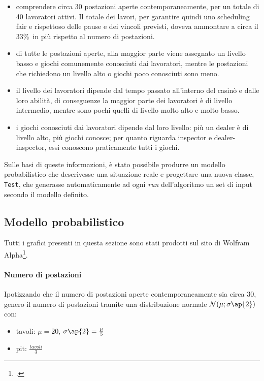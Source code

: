 \begin{itemize}
    \item comprendere circa 30 postazioni aperte contemporaneamente, per un totale di 40 lavoratori attivi. Il totale dei lavori, per garantire quindi uno scheduling fair e rispettoso delle pause e dei vincoli previsti, doveva ammontare a circa il 33\%\ in più rispetto al numero di postazioni.
    \item di tutte le postazioni aperte, alla maggior parte viene assegnato un livello basso e giochi comunemente conosciuti dai lavoratori, mentre le postazioni che richiedono un livello alto o giochi poco conosciuti sono meno.
    \item il livello dei lavoratori dipende dal tempo passato all'interno del casinò e dalle loro abilità, di conseguenze la maggior parte dei lavoratori è di livello intermedio, mentre sono pochi quelli di livello molto alto e molto basso.
    \item i giochi conosciuti dai lavoratori dipende dal loro livello: più un dealer è di livello alto, più giochi conosce; per quanto riguarda inspector e dealer-inspector, essi conoscono praticamente tutti i giochi.
\end{itemize}
Sulle basi di queste informazioni, è stato possibile produrre un modello probabilistico che descrivesse una situazione reale e progettare una nuova classe, \texttt{Test}, che generasse automaticamente ad ogni \textit{run} dell'algoritmo un set di input secondo il modello definito.

\subsection{Modello probabilistico}

Tutti i grafici presenti in questa sezione sono stati prodotti sul sito di Wolfram Alpha\footcite{https://www.wolframalpha.com/examples/StatisticalDistributions.html}.
    \paragraph{Numero di postazioni} Ipotizzando che il numero di postazioni aperte contemporaneamente sia circa 30, genero il numero di postazioni tramite una distribuzione normale $\mathcal{N}(\mu;\sigma \ap{2})$ con:
    \begin{itemize}
        \item tavoli: $\mu = 20$, $\sigma \ap{2} = \frac{\mu}{5}$
        \item pit: $\frac{tavoli}{3}$
    \end{itemize}

